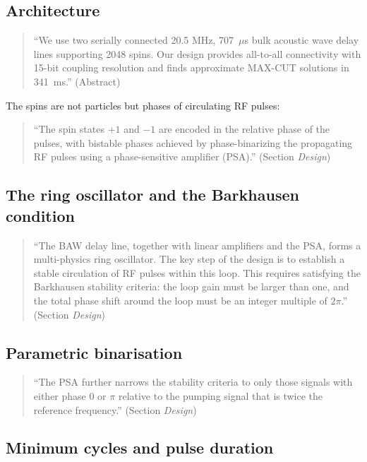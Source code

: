 \subsection{Architecture}

\begin{quote}\QM
``We use two serially connected 20.5 MHz, 707~$\mu$s bulk acoustic wave
delay lines supporting 2048 spins. Our design provides all-to-all
connectivity with 15-bit coupling resolution and finds approximate MAX-CUT
solutions in 341~ms.'' (Abstract)
\end{quote}
The spins are not particles but phases of circulating RF pulses:
\begin{quote}\QM
``The spin states $+1$ and $-1$ are encoded in the relative phase of the
pulses, with bistable phases achieved by phase-binarizing the propagating
RF pulses using a phase-sensitive amplifier (PSA).'' (Section \emph{Design})
\end{quote}

\subsection{The ring oscillator and the Barkhausen condition}

\begin{quote}\QM
``The BAW delay line, together with linear amplifiers and the PSA, forms a
multi-physics ring oscillator. The key step of the design is to establish a
stable circulation of RF pulses within this loop. This requires satisfying
the Barkhausen stability criteria: the loop gain must be larger than one,
and the total phase shift around the loop must be an integer multiple of
$2\pi$.'' (Section \emph{Design})
\end{quote}

\subsection{Parametric binarisation}

\begin{quote}\QM
``The PSA further narrows the stability criteria to only those signals with
either phase 0 or $\pi$ relative to the pumping signal that is twice the
reference frequency.'' (Section \emph{Design})
\end{quote}

\subsection{Minimum cycles and pulse duration}

